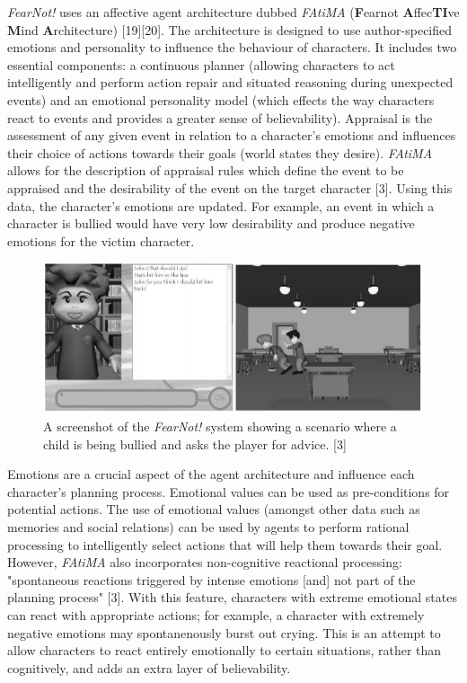 \documentclass{sig-alternate-05-2015}
\begin{document}
\newline \textit{FearNot!} uses an affective agent architecture dubbed \textit{FAtiMA} (\textbf{F}earnot \textbf{A}ffec\textbf{TI}ve \textbf{M}ind \textbf{A}rchitecture) [19][20]. The architecture is designed to use author-specified emotions and personality to influence the behaviour of characters. It includes two essential components: a continuous planner (allowing characters to act intelligently and perform action repair and situated reasoning during unexpected events) and an emotional personality model (which effects the way characters react to events and provides a greater sense of believability). Appraisal is the assessment of any given event in relation to a character's emotions and influences their choice of actions towards their goals (world states they desire). \textit{FAtiMA} allows for the description of appraisal rules which define the event to be appraised and the desirability of the event on the target character [3]. Using this data, the character's emotions are updated. For example, an event in which a character is bullied would have very low desirability and produce negative emotions for the victim character.\\

\begin{figure}
\centering
\includegraphics[scale=0.43]{Images/FearNot.png}
\caption{A screenshot of the \textit{FearNot!} system showing a scenario where a child is being bullied and asks the player for advice. [3]}
\end{figure}

\newline Emotions are a crucial aspect of the agent architecture and influence each character's planning process. Emotional values can be used as pre-conditions for potential actions. The use of emotional values (amongst other data such as memories and social relations) can be used by agents to perform rational processing to intelligently select actions that will help them towards their goal. However, \textit{FAtiMA} also incorporates non-cognitive reactional processing: "spontaneous reactions triggered by intense emotions [and] not part of the planning process" [3]. With this feature, characters with extreme emotional states can react with appropriate actions; for example, a character with extremely negative emotions may spontanenously burst out crying. This is an attempt to allow characters to react entirely emotionally to certain situations, rather than cognitively, and adds an extra layer of believability.
\end{document}
